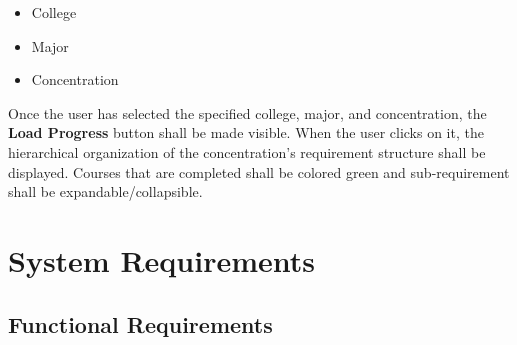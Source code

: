 \documentclass[12pt]{article}
\begin{document}
\begin{itemize}
  \item College
  \item Major
  \item Concentration
\end{itemize}

Once the user has selected the specified college, major, and concentration, the \textbf{Load
Progress} button shall be made visible. When the user clicks on it, the hierarchical organization of
the concentration's requirement structure shall be displayed. Courses that are completed shall be
colored green and sub-requirement shall be expandable/collapsible.

\section{System Requirements}
\subsection{Functional Requirements}

\newcommand{\screenshot}[2]{
  \begin{figure}[H]
    \centering
    \texttt{[image: \#1.png]}
    \caption{#2}
  \end{figure}
}

\newcommand{\screenshotstep}[3]{
  \clearpage
  \item #1
    \screenshot{#2}{#3}
}

\newcommand{\sysshall}{The system shall }
\newcommand{\stushall}{The student shall }
\newcommand{\usershall}{The user shall }
\newcommand{\loginpage}
  {\screenshotstep{\sysshall display the login page.}{login_page}{Login page}}
\newcommand{\mainmenu}{
  \screenshotstep
    {\sysshall display the main menu.}
    {existing_user_homepage}{Existing student homepage}
}
\newcommand{\clickmainmenu}{\stushall click the \textbf{Grade Tracker} button}
\newcommand{\redirecthome}{\sysshall redirect the student to the homepage.}
\newcommand{\gotohome}{
    \item \clickmainmenu
    \mainmenu
}

\newcommand{\studentclicks}[1]{Student clicks \textbf{#1} button}
\newcommand{\userclicks}[1]{User clicks \textbf{#1} button}

\newcommand{\gotohomess}[1]{
    \screenshotstep
      {\clickmainmenu}
      {#1}{\studentclicks{Grade Tracker}}
    \mainmenu
}
\end{document}
